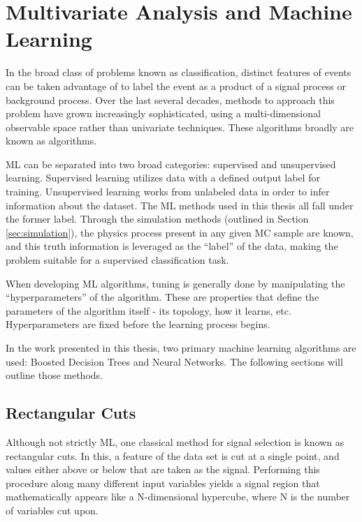 
\chapter{Multivariate Analysis and Machine Learning}

In the broad class of problems known as classification, distinct features of events can be taken advantage of to label the event as a product of a signal process or background process. Over the last several decades, methods to approach this problem have grown increasingly sophisticated, using a multi-dimensional observable space rather than univariate techniques. These algorithms broadly are known as  algorithms.


\gls{ML} can be separated into two broad categories: supervised and unsupervised learning. Supervised learning utilizes data with a defined output label for training. Unsupervised learning works from unlabeled data in order to infer information about the dataset. The \gls{ML} methods used in this thesis all fall under the former label. Through the simulation methods (outlined in Section \ref{sec:simulation}), the physics process present in any given \gls{MC} sample are known, and this truth information is leveraged as the ``label'' of the data, making the problem suitable for a supervised classification task.

When developing \gls{ML} algorithms, tuning is generally done by manipulating the ``hyperparameters'' of the algorithm. These are properties that define the parameters of the algorithm itself - its topology, how it learns, etc. Hyperparameters are fixed before the learning process begins.


In the work presented in this thesis, two primary machine learning algorithms are used: Boosted Decision Trees and Neural Networks. The following sections will outline those methods.

\section{Rectangular Cuts}

Although not strictly \gls{ML}, one classical method for signal selection is known as rectangular cuts. In this, a feature of the data set is cut at a single point, and values either above or below that are taken as the signal. Performing this procedure along many different input variables yields a signal region that mathematically appears like a N-dimensional hypercube, where N is the number of variables cut upon.

